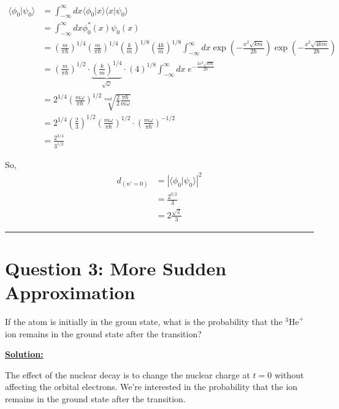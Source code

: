\documentclass{article}
\newcommand{\inner}[2]{\langle #1 | #2 \rangle}
\begin{document}
\begin{align*}
  \inner{\phi_0}{\psi_0} &= \int_{-\infty}^{\infty} dx \inner{\phi_0}{x} \inner{x}{\psi_0} \\
  &= \int_{-\infty}^{\infty} dx \phi_0^*(x) \psi_0(x) \\
  &= \left(\frac{m}{\pi \hbar}\right)^{1/4} \left(\frac{m}{\pi \hbar}\right)^{1/4} \left(\frac{k}{m}\right)^{1/8} \left(\frac{4k}{m}\right)^{1/8} \int_{-\infty}^{\infty} dx \exp\left(-\frac{x^2 \sqrt{km}}{2\hbar}\right) \exp\left(-\frac{x^2 \sqrt{4km}}{2\hbar}\right) \\
  &= \left(\frac{m}{\pi \hbar}\right)^{1/2} \cdot \underbrace{\left(\frac{k}{m}\right)^{1/4}}_{\sqrt{\omega}} \cdot (4)^{1/8} \int_{-\infty}^{\infty} dx \;e^{-\frac{3x^2 \sqrt{km}}{2\hbar}} \\
  &= 2^{1/4} \left(\frac{m\omega}{\pi \hbar}\right)^{1/2} \sqrt[root]{\frac{2}{2} \frac{\pi \hbar}{m \omega}} \\
  &= 2^{1/4} \left(\frac{2}{3}\right)^{1/2} \left(\frac{m\omega}{\pi \hbar}\right)^{1/2} \cdot \left(\frac{m\omega}{\pi \hbar}\right)^{-1/2} \\
  &= \frac{2^{3/4}}{3^{1/2}} 
\end{align*}

So, 
\begin{align*}
  d_{(n'=0)} &= \left|\inner{\phi_0}{\psi_0}\right|^2 \\
  &= \frac{2^{3/2}}{3} \\
  &= 2 \frac{\sqrt{2}}{3}
\end{align*}

\vskip 0.5cm 
\hrule 
\vskip 0.5cm


\section*{Question 3: More Sudden Approximation} 
If the atom is initially in the groun state, what is the probability that the $^3\text{He}^+$ ion remains in the ground state after the transition?

\vskip 0.5cm
\underline{\textbf{Solution:}} 

\vskip 0.5cm
The effect of the nuclear decay is to change the nuclear charge at $t = 0$ without affecting the orbital electrons. We're interested in the probability that the ion remains in the ground state after the transition.
\end{document}
